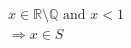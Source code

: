\documentclass[preview]{standalone}
\begin{document}
\begin{align*}
x \in \mathbb{R} \setminus \mathbb{Q} \text{ and } x < 1 \\ \Rightarrow x \in S
\end{align*}
\end{document}
